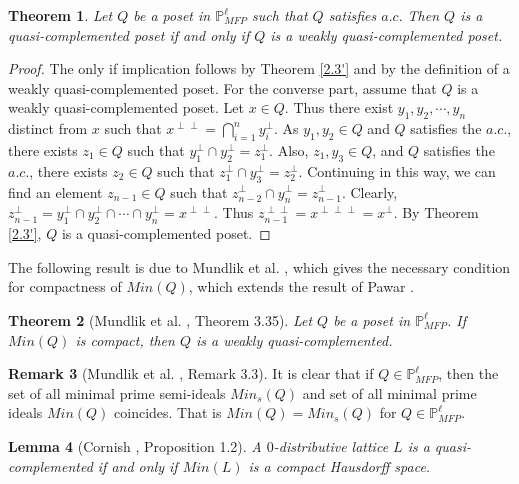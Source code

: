 \documentclass[10pt,one side,emlines]{amsart}
\newtheorem{lem}{Lemma}[section]
\newtheorem{thm}[lem]{Theorem}
\theoremstyle{definition}
\newtheorem{rem}[lem]{Remark}
\begin{document}
\begin{thm}\label{1.20}
	Let $Q$ be a poset in $\mathbb{P}^{\ell}_{MFP}$ such that $Q$ satisfies $a.c.$ Then $Q$ is a quasi-complemented poset if and only if $Q$ is a weakly quasi-complemented poset. 
\end{thm}

\begin{proof} The only if implication follows by Theorem \ref{2.3'} and by the definition of a weakly quasi-complemented poset.
	For the converse part, assume that $Q$ is a weakly quasi-complemented poset. Let $x\in Q$. Thus there exist $y_1, y_2,\cdots, y_n$ distinct from $x$ such that $x^{\perp \perp} = \bigcap_{i=1}^{n}y_{i}^{\perp }$. As $y_1, y_2\in Q$ and $Q$ satisfies the $a.c.$,  there exists $z_1\in Q$ such that $y_1^{\perp }\cap y_2^{\perp }=z_1^{\perp }$. Also, $z_1, y_3\in Q$, and $Q$ satisfies the $a.c.$, there exists $z_2\in Q$ such that $z_1^{\perp }\cap y_3^{\perp }=z_2^{\perp }$. Continuing in this way, we can find an element $z_{n-1}\in Q$ such that  $z_{n-2}^{\perp }\cap y_n^{\perp }=z_{n-1}^{\perp }$. Clearly, $z_{n-1}^{\perp } = y_1^{\perp }\cap y_2^{\perp }\cap \cdots \cap y_n^{\perp } =x^{\perp \perp} $. Thus $z_{n-1}^{\perp \perp }=x^{\perp \perp \perp}=x^{\perp }$. By Theorem \ref{2.3'}, $Q$ is a quasi-complemented poset. 
\end{proof}

The following result is due to Mundlik et al. \cite {MJH}, which gives the necessary condition for compactness of $Min(Q)$, which extends the result of Pawar \cite{PT 2}.

\begin{thm}[Mundlik et al. \cite {MJH}, Theorem 3.35]\label{3.35} Let $Q$ be a poset in $\mathbb{P}^{\ell}_{MFP}$. If $Min(Q)$ is compact, then $Q$ is a weakly quasi-complemented.   
\end{thm}

\begin{rem}[Mundlik et al. \cite{MJH}, Remark 3.3]\label{2.27} It is clear that if $Q\in \mathbb{P}^{\ell}_{MFP}$, then the set of all minimal prime semi-ideals $Min_s(Q)$ and set of all minimal prime ideals $Min(Q)$ coincides. That is $Min(Q) = Min_s(Q)$ for $Q\in \mathbb{P}^{\ell}_{MFP}$.
\end{rem}

\begin{lem}[Cornish \cite{C}, Proposition 1.2]\label{2.20}
	A $0$-distributive lattice $L$ is a quasi-complemented if and only if $Min(L)$ is a compact Hausdorff space.
\end{lem}
\end{document}
